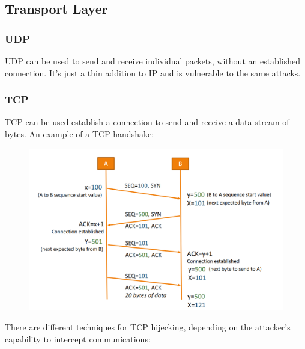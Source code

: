 \documentclass[10pt,a4paper]{report}
\begin{document}
\subsection{Transport Layer}
\subsubsection{UDP}
UDP  can be used to send and receive individual packets, without an established connection. It's just a thin addition to IP and is vulnerable to the same attacks.
\subsubsection{TCP}
TCP  can be used establish a connection to send and receive a data stream of bytes. An example of a TCP handshake:
\begin{figure}[H]
\centering
\includegraphics[scale=0.45]{9.png}
\end{figure}
There are different techniques for TCP hijecking, depending on the attacker’s capability to intercept communications:
\end{document}
